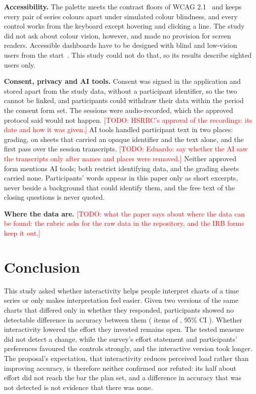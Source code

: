 \documentclass[10pt,twocolumn]{article}
\newcommand{\todo}[1]{\textcolor{red}{[TODO: #1]}}
\begin{document}
\textbf{Accessibility.} The palette meets the contrast floors of WCAG 2.1~\cite{w3c2018wcag21} and keeps every pair of series colours apart under simulated colour blindness, and every control works from the keyboard except hovering and clicking a line. The study did not ask about colour vision, however, and made no provision for screen readers. Accessible dashboards have to be designed with blind and low-vision users from the start~\cite{srinivasan2023,costanzachock2020}. This study could not do that, so its results describe sighted users only.

\textbf{Consent, privacy and AI tools.} Consent was signed in the application and stored apart from the study data, without a participant identifier, so the two cannot be linked, and participants could withdraw their data within the period the consent form set. The sessions were audio-recorded, which the approved protocol said would not happen. \todo{HSRRC's approval of the recordings: its date and how it was given.} AI tools handled participant text in two places: grading, on sheets that carried an opaque identifier and the text alone, and the first pass over the session transcripts. \todo{Eduardo: say whether the AI saw the transcripts only after names and places were removed.} Neither approved form mentions AI tools; both restrict identifying data, and the grading sheets carried none. Participants' words appear in this paper only as short excerpts, never beside a background that could identify them, and the free text of the closing questions is never quoted.

\textbf{Where the data are.} \todo{what the paper says about where the data can be found: the rubric asks for the raw data in the repository, and the IRB forms keep it out.}

\section{Conclusion}
\label{sec:conclusion}

This study asked whether interactivity helps people interpret charts of a time series or only makes interpretation feel easier. Given two versions of the same charts that differed only in whether they responded,  participants showed no detectable difference in accuracy between them ( items of , 95\% CI ). Whether interactivity lowered the effort they invested remains open. The tested measure did not detect a change, while the survey's effort statement and participants' preferences favoured the controls strongly, and the interactive version took longer. The proposal's expectation, that interactivity reduces perceived load rather than improving accuracy, is therefore neither confirmed nor refuted: its half about effort did not reach the bar the plan set, and a difference in accuracy that was not detected is not evidence that there was none.
\end{document}
